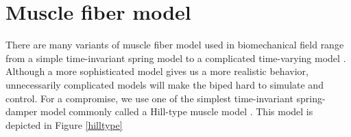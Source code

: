 \documentclass[master,english,final]{kaist-ucs}
\begin{document}


\section{Muscle fiber model}

There are many variants of muscle fiber model used in biomechanical field range
from a simple time-invariant spring model to a complicated time-varying model \cite{25733}.
Although a more sophisticated model gives us a more realistic behavior, unnecessarily
complicated models will make the biped hard to simulate and control.
For a compromise, we use one of the simplest time-invariant spring-damper model commonly called
a Hill-type muscle model \cite{hill}. This model is depicted in Figure \ref{hilltype}
\end{document}
